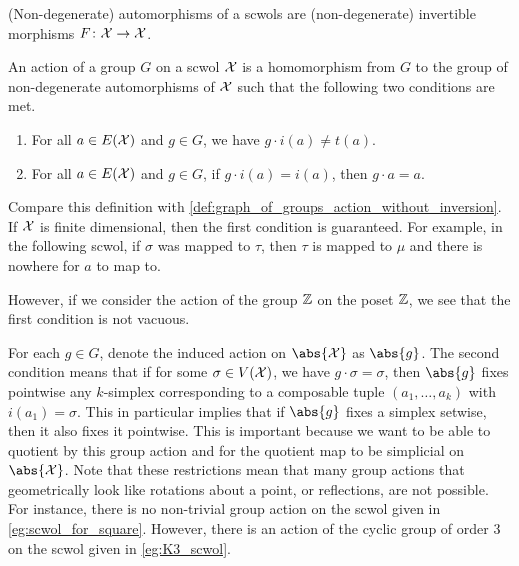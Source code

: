 (Non-degenerate) automorphisms of a scwols are (non-degenerate) invertible morphisms $F \colon \mathcal{X} \to \mathcal{X}$.

\begin{definition}
	An action of a group $G$ on a scwol $\mathcal{X}$ is a homomorphism from $G$ to the group of non-degenerate automorphisms of $\mathcal{X}$ such that the following two conditions are met.
	\begin{enumerate}
		\item For all $a \in E(\mathcal{X})$ and $g \in G$, we have  $g \cdot i(a) \neq t(a)$.
		\item For all $a \in E(\mathcal{X})$ and $g \in G$, if  $g\cdot i(a)=i(a)$, then  $g\cdot a = a$.
	\end{enumerate}
	\label{def:action_of_groups_on_scwols}
\end{definition}
Compare this definition with \cref{def:graph_of_groups_action_without_inversion}.
If $\mathcal{X}$ is finite dimensional, then the first condition is guaranteed.
For example, in the following scwol, if $\sigma$ was mapped to  $\tau$, then $\tau$ is mapped to $\mu$ and there is nowhere for $a$ to map to.

\begin{center}
\end{center}

However, if we consider the action of the group $\mathbb{Z}$ on the poset $\mathbb{Z}$, we see that  the first condition is not vacuous.

For each $g \in G$, denote the induced action on  $\abs{\calx}$ as $\abs{g}$.
The second condition means that if for some $\sigma \in V(\mathcal{X})$, we have $g \cdot \sigma = \sigma$, then $\abs{g}$ fixes pointwise any $k$-simplex corresponding to a composable tuple $(a_1,  \ldots, a_k)$ with $i(a_1)=\sigma$.
This in particular implies that if $\abs{g}$ fixes a simplex setwise, then it also fixes it pointwise.
This is important because we want to be able to quotient by this group action and for the quotient map to be simplicial on $\abs{\calx}$.
Note that these restrictions mean that many group actions that geometrically look like rotations about a point, or reflections, are not possible.
For instance, there is no non-trivial group action on the scwol given in \cref{eg:scwol_for_square}.
However, there is an action of the cyclic group of order 3 on the scwol given in \cref{eg:K3_scwol}.

